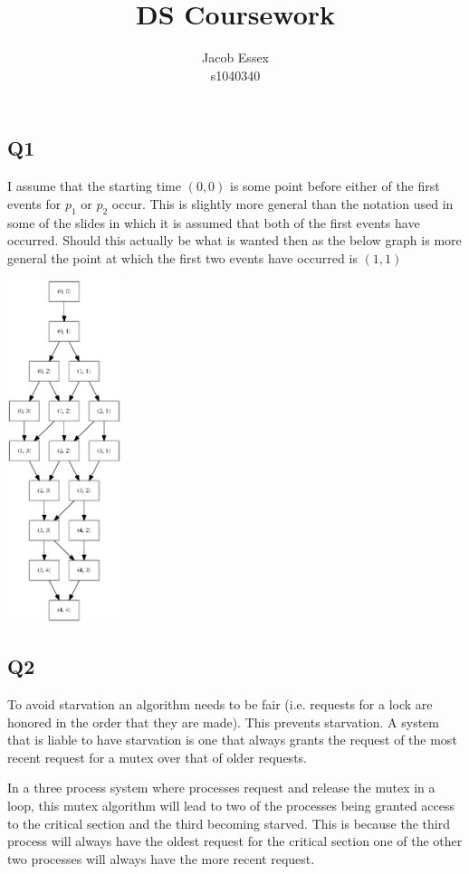 \documentclass[11pt]{article}
\begin{document}
\title{DS Coursework}
\author{Jacob Essex \\ s1040340}
\date{}
\maketitle

\subsection*{Q1}

I assume that the starting time $(0,0)$ is some point before either of the first events for $p_1$ or $p_2$ occur. This is slightly more general than the notation used in some of the slides in which it is assumed that both of the first events have occurred. Should this actually be what is wanted then as the below graph is more general the point at which the first two events have occurred is $(1,1)$

\includegraphics[width=0.25\textwidth]{q1_theory.png}


\subsection*{Q2}
To avoid starvation an algorithm needs to be fair (i.e. requests for a lock are honored in the order that they are made). This prevents starvation. A system that is liable to have starvation is one that always grants the request of the most recent request for a mutex over that of older requests.

In a three process system where processes request and release the mutex in a loop, this mutex algorithm will lead to two of the processes being granted access to the critical section and the third becoming starved. This is because the third process will always have the oldest request for the critical section one of the other two processes will always have the more recent request.
\end{document}
